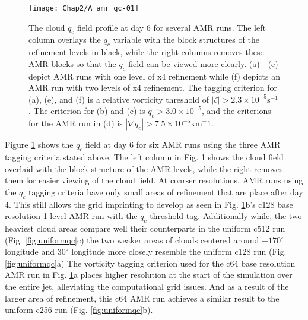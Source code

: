 \begin{figure}
   \centerline{%
   \noindent
   \texttt{[image: Chap2/A\_amr\_qc-01]}}
   \caption{The cloud $q_c$ field profile at day 6 for several AMR runs.  The left column overlays
   the $q_c$ variable with the block structures of the refinement levels in black, while the right columns
   removes these AMR blocks so that the $q_c$ field can be viewed more clearly. 
  (a) - (e) depict AMR runs with one level of x4 refinement while (f) depicts an AMR run with two levels
  of x4 refinement. The tagging criterion for (a), (e), and (f) is a relative vorticity threshold of
  $|\zeta| > 2.3 \times 10^{-5} \mathrm{s}^{-1}$. The criterion for (b) and (c) is $q_c > 3.0\times 10^{-5}$,
  and the criterions for the AMR run in (d) is $|\nabla q_c | > 7.5\times 10^{-5}\mathrm{km}^-1$.
   }
   \label{fig:amrqc}
\end{figure}

Figure \ref{fig:amrqc} shows the $q_c$ field at day 6 for six AMR runs using the three
AMR tagging criteria stated above. The left column in Fig.  \ref{fig:amrqc} shows the
cloud field overlaid with the block structure of the AMR levels, while the right removes
them for easier viewing of the cloud field. 
At coarser resolutions, AMR runs using the $q_c$ tagging criteria have only small 
areas of refinement that are place after day 4. This still allows 
the grid imprinting to develop as seen in Fig. \ref{fig:amrqc}b's c128 base resolution
1-level AMR run with the $q_c$ threshold tag. Additionally while, the two
heaviest cloud areas compare well their counterparts in the uniform c512 run (Fig. \ref{fig:uniformqc}c)
the two weaker areas of clouds centered around $-170^\circ$ longitude
and $30^\circ$ longitude more closely resemble the uniform c128 run (Fig. \ref{fig:uniformqc}a)
The vorticity tagging
criterion used for the c64 base resolution AMR run in Fig. \ref{fig:amrqc}a places higher resolution 
at the start of the simulation over the entire jet, alleviating the computational grid issues.
And as a result of the larger area of refinement, this c64 AMR run achieves a similar result to the
uniform c256 run (Fig. \ref{fig:uniformqc}b). 

